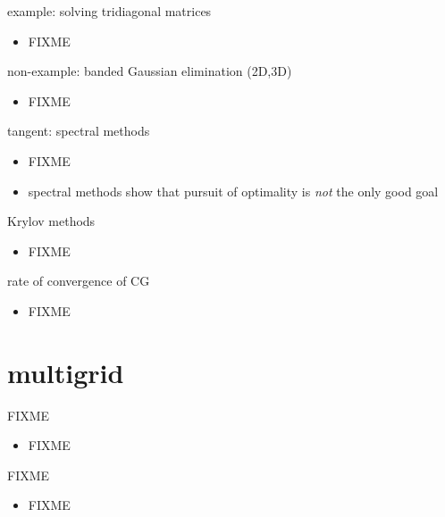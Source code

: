 \documentclass[hide notes,intlimits,usenames,dvipsnames]{beamer}
\begin{document}
\begin{frame}{example: solving tridiagonal matrices}
\begin{itemize}
\item FIXME
\end{itemize}
\end{frame}

\begin{frame}{non-example:  banded Gaussian elimination (2D,3D)}
\begin{itemize}
\item FIXME
\end{itemize}
\end{frame}

\begin{frame}{tangent: spectral methods}
\begin{itemize}
\item FIXME
\item spectral methods show that pursuit of optimality is \emph{not} the only good goal
\end{itemize}
\end{frame}

\begin{frame}{Krylov methods}
\begin{itemize}
\item FIXME
\end{itemize}
\end{frame}

\begin{frame}{rate of convergence of CG}
\begin{itemize}
\item FIXME
\end{itemize}
\end{frame}


\section{multigrid}

\begin{frame}{FIXME}
\begin{itemize}
\item FIXME
\end{itemize}
\end{frame}

\begin{frame}{FIXME}
\begin{itemize}
\item FIXME
\end{itemize}
\end{frame}
\end{document}
